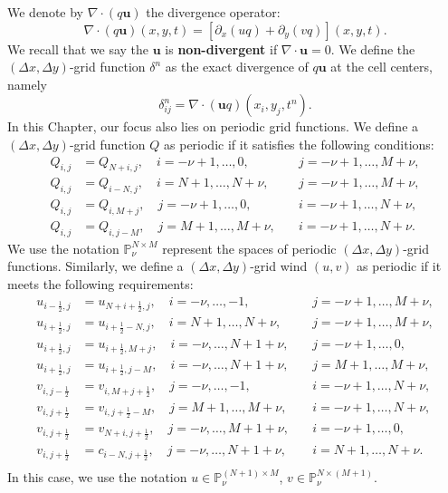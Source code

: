 We denote by $\nabla \cdot (q\boldsymbol{u})$ the divergence operator:
\begin{equation}
	\label{sec-adv2d:eqdiv}
	\nabla \cdot (q\boldsymbol{u})(x, y, t) =  
	[{\partial_x (uq)} + {\partial_y (vq)}](x, y, t).
\end{equation}
We recall that we say the $\boldsymbol{u}$ is \textbf{non-divergent} if $\nabla \cdot \boldsymbol{u}=0$.
We define the $(\Delta x, \Delta y)$-grid function $\delta^n$ as
the exact divergence of $q\boldsymbol{u}$ at the cell centers, namely
\begin{equation}
\label{2d-discrete-div}
\delta^n_{ij} = \nabla \cdot (\boldsymbol{u}q)(x_i,y_j,t^n).
\end{equation}
In this Chapter, our focus also lies on periodic grid functions.
We define a $(\Delta x, \Delta y)$-grid function $Q$ as periodic if it satisfies the following conditions:
\begin{align*}
    Q_{i,j} &= Q_{N+i,j}, \quad i=-\nu+1, \ldots, 0,  \quad &j = -\nu+1, \ldots, M+\nu,\\
    Q_{i,j} &= Q_{i-N,j}, \quad i=N+1, \ldots, N+\nu, \quad &j = -\nu+1, \ldots, M+\nu,\\
    Q_{i,j} &= Q_{i,M+j}, \quad j=-\nu+1, \ldots, 0,  \quad &i = -\nu+1, \ldots, N+\nu,\\
    Q_{i,j} &= Q_{i,j-M}, \quad j=M+1, \ldots, M+\nu, \quad &i = -\nu+1, \ldots, N+\nu.
\end{align*}
We use the notation $\mathbb{P}^{N \times M}_{\nu}$ represent the spaces of periodic $(\Delta x, \Delta y)$-grid functions.
Similarly, we define a $(\Delta x, \Delta y)$-grid wind $(u,v)$ as periodic if it meets the following requirements:
\begin{align*}
    u_{i-\frac{1}{2},j} &= u_{N+i+\frac{1}{2},j} , \quad i=-\nu, \ldots, -1,   \quad &j = -\nu+1, \ldots, M+\nu,\\
    u_{i+\frac{1}{2},j} &= u_{i+\frac{1}{2}-N,j} , \quad i=N+1, \ldots, N+\nu, \quad &j = -\nu+1, \ldots, M+\nu,\\
    u_{i+\frac{1}{2},j} &= u_{i+\frac{1}{2},M+j} , \quad i=-\nu, \ldots, N+1+\nu,   \quad &j = -\nu+1, \ldots, 0,\\
    u_{i+\frac{1}{2},j} &= u_{i+\frac{1}{2},j-M} , \quad i=-\nu, \ldots, N+1+\nu,   \quad &j = M+1, \ldots, M+\nu,\\
    v_{i,j-\frac{1}{2}} &= v_{i,M+j+\frac{1}{2}} , \quad j=-\nu, \ldots, -1,   \quad &i = -\nu+1, \ldots, N+\nu,\\
    v_{i,j+\frac{1}{2}} &= v_{i,j+\frac{1}{2}-M} , \quad j=M+1, \ldots, M+\nu, \quad &i = -\nu+1, \ldots, N+\nu,\\
    v_{i,j+\frac{1}{2}} &= v_{N+i,j+\frac{1}{2}} , \quad j=-\nu, \ldots, M+1+\nu,   \quad &i = -\nu+1, \ldots, 0,\\
    v_{i,j+\frac{1}{2}} &= c_{i-N,j+\frac{1}{2}} , \quad j=-\nu, \ldots, N+1+\nu,   \quad &i = N+1, \ldots, N+\nu.\\
\end{align*}
In this case, we use the notation $u \in \mathbb{P}^{(N+1) \times M}_{\nu}$, 
$v \in \mathbb{P}^{N \times (M+1)}_{\nu}$.

